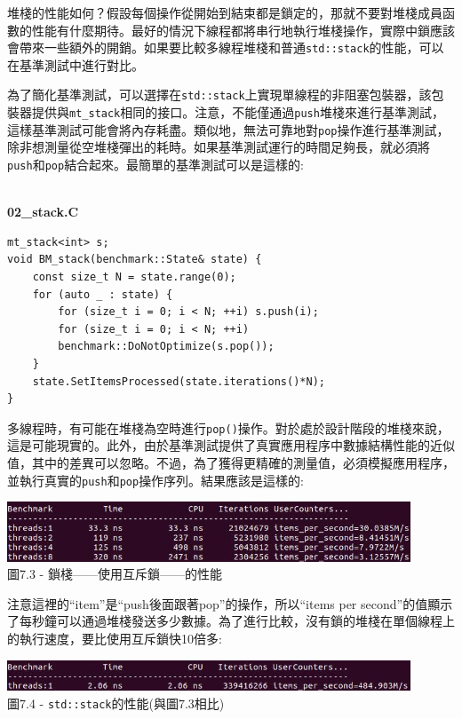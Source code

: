 堆棧的性能如何？假設每個操作從開始到結束都是鎖定的，那就不要對堆棧成員函數的性能有什麼期待。最好的情況下線程都將串行地執行堆棧操作，實際中鎖應該會帶來一些額外的開銷。如果要比較多線程堆棧和普通\texttt{std::stack}的性能，可以在基準測試中進行對比。

為了簡化基準測試，可以選擇在\texttt{std::stack}上實現單線程的非阻塞包裝器，該包裝器提供與\texttt{mt\_stack}相同的接口。注意，不能僅通過\texttt{push}堆棧來進行基準測試，這樣基準測試可能會將內存耗盡。類似地，無法可靠地對\texttt{pop}操作進行基準測試，除非想測量從空堆棧彈出的耗時。如果基準測試運行的時間足夠長，就必須將\texttt{push}和\texttt{pop}結合起來。最簡單的基準測試可以是這樣的:

\hspace*{\fill} \\ %
\noindent
\textbf{02\_stack.C}
\begin{lstlisting}[style=styleCXX]
mt_stack<int> s;
void BM_stack(benchmark::State& state) {
	const size_t N = state.range(0);
	for (auto _ : state) {
		for (size_t i = 0; i < N; ++i) s.push(i);
		for (size_t i = 0; i < N; ++i)
		benchmark::DoNotOptimize(s.pop());
	}
	state.SetItemsProcessed(state.iterations()*N);
}
\end{lstlisting}

多線程時，有可能在堆棧為空時進行\texttt{pop()}操作。對於處於設計階段的堆棧來說，這是可能現實的。此外，由於基準測試提供了真實應用程序中數據結構性能的近似值，其中的差異可以忽略。不過，為了獲得更精確的測量值，必須模擬應用程序，並執行真實的\texttt{push}和\texttt{pop}操作序列。結果應該是這樣的:

\begin{center}
\includegraphics[width=0.9\textwidth]{content/2/chapter7/images/3.jpg}\\
圖7.3 - 鎖棧——使用互斥鎖——的性能
\end{center}

注意這裡的“item”是“push後面跟著pop”的操作，所以“items per second”的值顯示了每秒鐘可以通過堆棧發送多少數據。為了進行比較，沒有鎖的堆棧在單個線程上的執行速度，要比使用互斥鎖快10倍多:

\begin{center}
\includegraphics[width=0.9\textwidth]{content/2/chapter7/images/4.jpg}\\
圖7.4 - \texttt{std::stack}的性能(與圖7.3相比)
\end{center}

